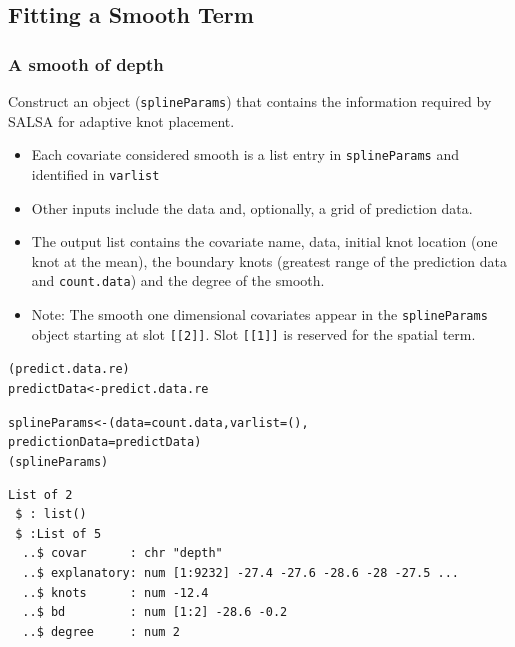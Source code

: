 \subsection{Fitting a Smooth Term}

\begin{frame}[fragile]
\frametitle{A smooth of depth}

Construct an object ({\tt splineParams}) that contains the information required by SALSA for adaptive knot placement.

\begin{itemize}
\item Each covariate considered smooth is a list entry in {\tt splineParams} and identified in {\tt varlist}
\item Other inputs include the data and, optionally, a grid of prediction data.
\item The output list contains the covariate name, data, initial knot location (one knot at the mean), the boundary knots (greatest range of the prediction data and {\tt count.data}) and the degree of the smooth.
\item Note:  The smooth one dimensional covariates appear in the {\tt splineParams} object starting at slot {\tt [[2]]}. Slot {\tt [[1]]} is reserved for the spatial term.
\end{itemize}

\begin{knitrout}\footnotesize
{}\color{fgcolor}\begin{kframe}
\begin{alltt}
(predict.data.re)
predictData<-predict.data.re

splineParams<-(data=count.data, varlist=(),
         predictionData=predictData)
(splineParams)
\begin{verbatim}
List of 2
 $ : list()
 $ :List of 5
  ..$ covar      : chr "depth"
  ..$ explanatory: num [1:9232] -27.4 -27.6 -28.6 -28 -27.5 ...
  ..$ knots      : num -12.4
  ..$ bd         : num [1:2] -28.6 -0.2
  ..$ degree     : num 2
\end{verbatim}
\end{alltt}
\end{kframe}
\end{knitrout}

\end{frame}

